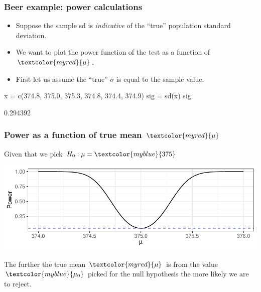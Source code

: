 \documentclass[a4paper]{article}
\begin{document}
\subsubsection{Beer example: power calculations}
\begin{itemize}
	\item Suppose the sample sd is \textit{indicative} of the ``true'' population standard deviation.
	\item We want to plot the power function of the test as a function of \( \textcolor{myred}{\mu} \).
	\item First let us assume the ``true'' \( \sigma \) is equal to the sample value.
\end{itemize}
\begin{Schunk}
\begin{Sinput}
x = c(374.8, 375.0, 375.3, 374.8, 374.4, 374.9)
sig = sd(x)  
sig
\end{Sinput}
\begin{Soutput}
[1] 0.294392
\end{Soutput}
\end{Schunk}
\subsubsection{Power as a function of true mean \( \textcolor{myred}{\mu} \)}
Given that we pick \( H_0: \mu = \textcolor{myblue}{375} \) 
\begin{Schunk}


{\centering \includegraphics[width=\maxwidth]{figure/listings-unnamed-chunk-94-1} 

}

\end{Schunk}
The further the true mean \( \textcolor{myred}{\mu} \) is from the value \( \textcolor{myblue}{\mu_0} \) picked for the null hypothesis the more likely we are to reject.
\end{document}
